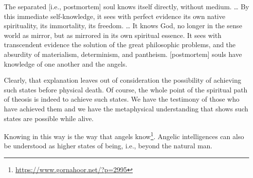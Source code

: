 \begin{quotex}
The separated [i.e., postmortem] soul knows itself directly, without medium. … By this immediate self-knowledge, it sees with perfect evidence its own native spirituality, its immortality, its freedom. … It knows God, no longer in the sense world as mirror, but as mirrored in its own spiritual essence. It sees with transcendent evidence the solution of the great philosophic problems, and the absurdity of materialism, determinism, and pantheism. [postmortem] souls have knowledge of one another and the angels. 

\end{quotex}
Clearly, that explanation leaves out of consideration the possibility of achieving such states before physical death. Of course, the whole point of the spiritual path of theosis is indeed to achieve such states. We have the testimony of those who have achieved them and we have the metaphysical understanding that shows such states are possible while alive.

Knowing in this way is the way that angels know\footnote{\url{https://www.gornahoor.net/?p=2995}}. Angelic intelligences can also be understood as higher states of being, i.e., beyond the natural man.



